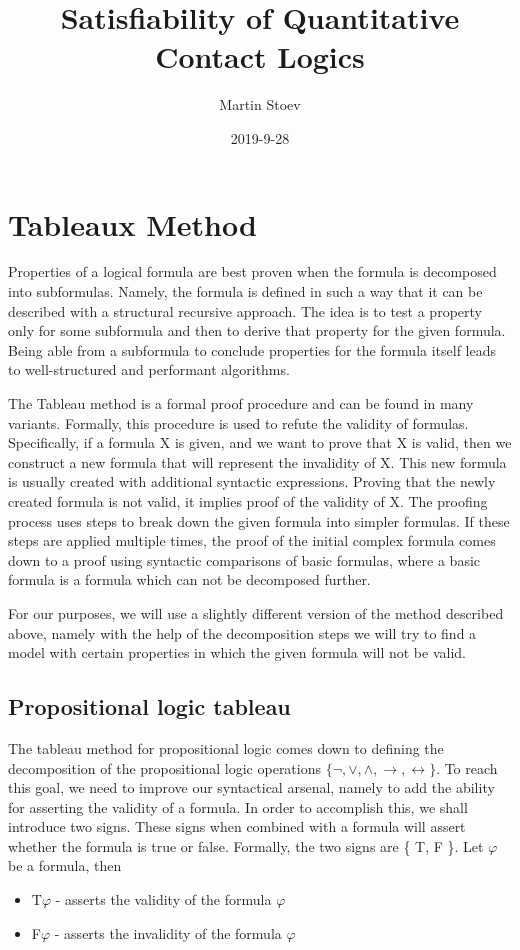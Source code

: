 \documentclass{article}
\title{Satisfiability of Quantitative Contact Logics}
\date{2019-9-28}
\author{Martin Stoev}
\begin{document}
	\maketitle
 	\thispagestyle{empty}
	\newpage

	\tableofcontents

	\newpage
	\section{Tableaux Method}
Properties of a logical formula are best proven when the formula is decomposed into subformulas. Namely, the formula is defined in such a way that it can be described with a structural recursive approach. The idea is to test a property only for some subformula and then to derive that property for the given formula.
Being able from a subformula to conclude properties for the formula itself leads to well-structured and performant algorithms.

The Tableau method is a formal proof procedure and can be found in many variants. Formally, this procedure is used to refute the validity of formulas. Specifically, if a formula X is given, and we want to prove that X is valid, then we construct a new formula that will represent the invalidity of X. This new formula is usually created with additional syntactic expressions. Proving that the newly created formula is not valid, it implies proof of the validity of X. The proofing process uses steps to break down the given formula into simpler formulas. If these steps are applied multiple times, the proof of the initial complex formula comes down to a proof using syntactic comparisons of basic formulas, where a basic formula is a formula which can not be decomposed further.

For our purposes, we will use a slightly different version of the method described above, namely with the help of the decomposition steps we will try to find a model with certain properties in which the given formula will not be valid.

		\subsection{Propositional logic tableau}
The tableau method for propositional logic comes down to defining the decomposition of the propositional logic operations $\{ \neg, \vee, \wedge, \rightarrow, \leftrightarrow \}$. To reach this goal, we need to improve our syntactical arsenal, namely to add the ability for asserting the validity of a formula. In order to accomplish this, we shall introduce two signs. These signs when combined with a formula will assert whether the formula is true or false. Formally, the two signs are \{ T, F \}. Let $\varphi$ be a formula, then
\begin{itemize}
	\item T$\varphi$ - asserts the validity of the formula $\varphi$
	\item F$\varphi$ - asserts the invalidity of the formula $\varphi$
\end{itemize} 
\end{document}
